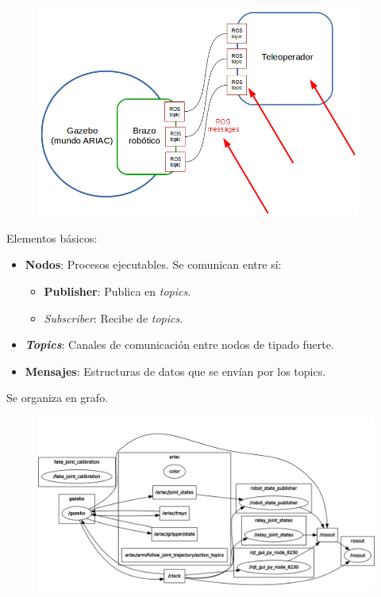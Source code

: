\documentclass[notes,slidesec,a4]{seminar}
\begin{document}
\begin{hslide}
	\begin{center}
		\begin{figure}
			\includegraphics[width=0.95\textwidth]{graficobrazo.png}
		\end{figure}
	\end{center}
\end{hslide}

\begin{hslide}
	Elementos básicos:
	\begin{itemize}
		\item \textbf{Nodos}: Procesos ejecutables. Se comunican entre sí:
		\begin{itemize}
			\item \textbf{Publisher}: Publica en \textit{topics}.
			\item \textit{Subscriber}: Recibe de \textit{topics}.
		\end{itemize}
		\item \textbf{\textit{Topics}}: Canales de comunicación entre nodos de tipado fuerte. 
		\item \textbf{Mensajes}: Estructuras de datos que se envían por los topics.
	\end{itemize}
	Se organiza en grafo.
\end{hslide}


\begin{hslide}
	\begin{center}
		\begin{figure}
			\includegraphics[width=\textwidth]{Brazo10.png}
		\end{figure}
	\end{center}
\end{hslide}
\end{document}
